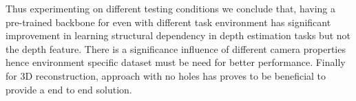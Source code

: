 Thus experimenting on different testing conditions we conclude that, having a pre-trained backbone for even with different task environment has significant improvement in learning structural dependency in depth estimation tasks but not the depth feature. There is a significance influence of different camera properties hence environment specific dataset must be need for better performance. Finally for 3D reconstruction, approach with no holes has proves to be beneficial to provide a end to end solution.

